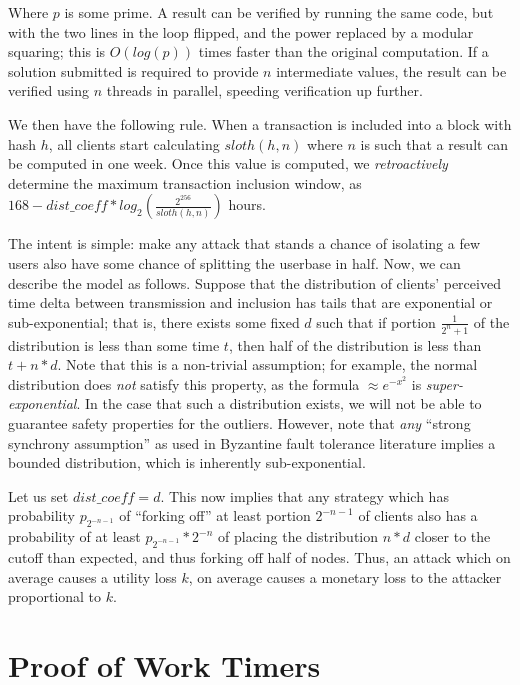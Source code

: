 \documentclass[12pt]{article}
\begin{document}
Where $p$ is some prime. A result can be verified by running the same code, but with the two lines in the loop flipped, and the power replaced by a modular squaring; this is $O(log(p))$ times faster than the original computation. If a solution submitted is required to provide $n$ intermediate values, the result can be verified using $n$ threads in parallel, speeding verification up further.

We then have the following rule. When a transaction is included into a block with hash $h$, all clients start calculating $sloth(h, n)$ where $n$ is such that a result can be computed in one week. Once this value is computed, we \textit{retroactively} determine the maximum transaction inclusion window, as $168 - dist\_coeff * log_2(\frac{2^{256}}{sloth(h, n)})$ hours.

The intent is simple: make any attack that stands a chance of isolating a few users also have some chance of splitting the userbase in half. Now, we can describe the model as follows. Suppose that the distribution of clients' perceived time delta between transmission and inclusion has tails that are exponential or sub-exponential; that is, there exists some fixed $d$ such that if portion $\frac{1}{2^n+1}$ of the distribution is less than some time $t$, then half of the distribution is less than $t + n * d$. Note that this is a non-trivial assumption; for example, the normal distribution does \textit{not} satisfy this property, as the formula $\approx e^{-x^2}$ is \textit{super-exponential}. In the case that such a distribution exists, we will not be able to guarantee safety properties for the outliers. However, note that \textit{any} ``strong synchrony assumption'' as used in Byzantine fault tolerance literature implies a bounded distribution, which is inherently sub-exponential.

Let us set $dist\_coeff = d$. This now implies that any strategy which has probability $p_{2^{-n-1}}$ of ``forking off'' at least portion $2^{-n-1}$ of clients also has a probability of at least $p_{2^{-n-1}} * 2^{-n}$ of placing the distribution $n * d$ closer to the cutoff than expected, and thus forking off half of nodes. Thus, an attack which on average causes a utility loss $k$, on average causes a monetary loss to the attacker proportional to $k$.

\section{Proof of Work Timers}
\end{document}
